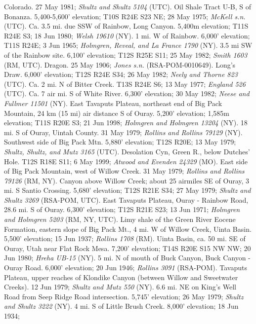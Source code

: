 Colorado. 27 May 1981; \textit{Shultz and Shultz 5104} (UTC).
Oil Shale Tract U-B, S of Bonanza. 5,400-5,600' elevation; T10S R24E S23 NE;
28 May 1975; \textit{McKell s.n.} (UTC).
Ca. 3.5 mi. due SSW of Rainbow, Long Canyon. 5,400m elevation; T11S R24E S3;
18 Jun 1980; \textit{Welsh 19610} (NY).
1 mi. W of Rainbow. 6,000' elevation; T11S R24E; 3 Jun 1965;
\textit{Holmgren, Reveal, and La France 1790} (NY).
3.5 mi SW of the Rainbow site. 6,100' elevation; T12S R25E S11; 25 May 1982;
\textit{Smith 1603} (RM, UTC).
Dragon. 25 May 1906; \textit{Jones s.n.} (RSA-POM-0010649).
Long's Draw. 6,000' elevation; T12S R24E S34; 26 May 1982;
\textit{Neely and Thorne 823} (UTC).
Ca. 2 mi. N of Bitter Creek. T13S R24E S6; 13 May 1977;
\textit{England 526} (UTC).
Ca. 7 air mi. S of White River. 6,300' elevation; 30 May 1982;
\textit{Neese and Fullmer 11501} (NY).
East Tavaputs Plateau, northeast end of Big Pack Mountain, 24 km (15 mi) air
distance S of Ouray. 5,200' elevation; 1,585m elevation; T11S R20E S3;
21 Jun 1998; \textit{Holmgren and Holmgren 13204} (NY).
18 mi. S of Ouray, Uintah County. 31 May 1979;
\textit{Rollins and Rollins 79129} (NY).
Southwest side of Big Pack Mtn. 5,880' elevation; T12S R20E; 13 May 1979;
\textit{Shultz, Shultz, and Mutz 3165} (UTC).
Desolation Cyn, Green R., below Dutches' Hole. T12S R18E S11; 6 May 1999;
\textit{Atwood and Evenden 24329} (MO).
East side of Big Pack Mountain, west of Willow Creek. 31 May 1979;
\textit{Rollins and Rollins 79126} (RM, NY).
Canyon above Willow Creek; about 25 airmiles SE of Ouray, 3 mi. S Santio
Crossing. 5,680' elevation; T12S R21E S34; 27 May 1979;
\textit{Shultz and Shultz 3269} (RSA-POM, UTC).
East Tavaputs Plateau, Ouray - Rainbow Road, 28.6 mi. S of Ouray.
6,300' elevation; T12S R21E S23; 13 Jun 1971;
\textit{Holmgren and Holmgren 5203} (RM, NY, UTC).
Limy shale of the Green River Eocene Formation, eastern slope of Big Pack Mt.,
4 mi. W of Willow Creek, Uinta Basin. 5,500' elevation; 15 Jun 1937;
\textit{Rollins 1708} (RM).
Uinta Basin, ca. 50 mi. SE of Ouray, Utah near Flat Rock Mesa.
7,200' elevation; T14S R20E S15 NW NW; 20 Jun 1980; \textit{Hreha UB-15} (NY).
5 mi. N of mouth of Buck Canyon, Buck Canyon - Ouray Road. 6,000' elevation;
20 Jun 1946; \textit{Rollins 3091} (RSA-POM).
Tavaputs Plateau, upper reaches of Klondike Canyon (between Willow and
Sweetwater Creeks). 12 Jun 1979; \textit{Shultz and Mutz 550} (NY).
6.6 mi. NE on King's Well Road from Seep Ridge Road intersection.
5,745' elevation; 26 May 1979; \textit{Shultz and Shultz 3222} (NY).
4 mi. S of Little Brush Creek. 8,000' elevation; 18 Jun 1934;
